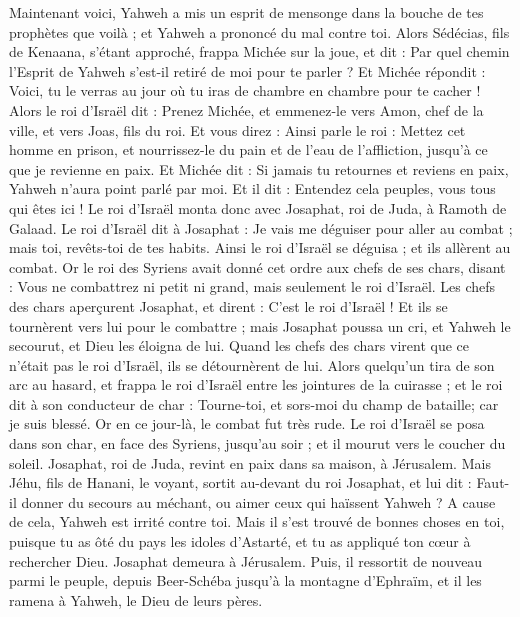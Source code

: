 \begin{multicols}{2}
Maintenant voici, Yahweh a mis un esprit de mensonge dans la bouche de tes prophètes que voilà ; et Yahweh a prononcé du mal contre toi.
Alors Sédécias, fils de Kenaana, s'étant approché, frappa Michée sur la joue, et dit : Par quel chemin l'Esprit de Yahweh s'est-il retiré de moi pour te parler ?
Et Michée répondit : Voici, tu le verras au jour où tu iras de chambre en chambre pour te cacher !
Alors le roi d'Israël dit : Prenez Michée, et emmenez-le vers Amon, chef de la ville, et vers Joas, fils du roi.
Et vous direz : Ainsi parle le roi : Mettez cet homme en prison, et nourrissez-le du pain et de l'eau de l'affliction, jusqu'à ce que je revienne en paix.
Et Michée dit : Si jamais tu retournes et reviens en paix, Yahweh n'aura point parlé par moi. Et il dit : Entendez cela peuples, vous tous qui êtes ici !
Le roi d'Israël monta donc avec Josaphat, roi de Juda, à Ramoth de Galaad.
Le roi d'Israël dit à Josaphat : Je vais me déguiser pour aller au combat ; mais toi, revêts-toi de tes habits. Ainsi le roi d'Israël se déguisa ; et ils allèrent au combat.
Or le roi des Syriens avait donné cet ordre aux chefs de ses chars, disant : Vous ne combattrez ni petit ni grand, mais seulement le roi d'Israël.
Les chefs des chars aperçurent Josaphat, et dirent : C'est le roi d'Israël ! Et ils se tournèrent vers lui pour le combattre ; mais Josaphat poussa un cri, et Yahweh le secourut, et Dieu les éloigna de lui.
Quand les chefs des chars virent que ce n'était pas le roi d'Israël, ils se détournèrent de lui.
Alors quelqu'un tira de son arc au hasard, et frappa le roi d'Israël entre les jointures de la cuirasse ; et le roi dit à son conducteur de char : Tourne-toi, et sors-moi du champ de bataille; car je suis blessé.
Or en ce jour-là, le combat fut très rude. Le roi d'Israël se posa dans son char, en face des Syriens, jusqu'au soir ; et il mourut vers le coucher du soleil.
\VerseOne{}Josaphat, roi de Juda, revint en paix dans sa maison, à Jérusalem.
Mais Jéhu, fils de Hanani, le voyant, sortit au-devant du roi Josaphat, et lui dit : Faut-il donner du secours au méchant, ou aimer ceux qui haïssent Yahweh ? A cause de cela, Yahweh est irrité contre toi.
Mais il s'est trouvé de bonnes choses en toi, puisque tu as ôté du pays les idoles d'Astarté, et tu as appliqué ton cœur à rechercher Dieu.
Josaphat demeura à Jérusalem. Puis, il ressortit de nouveau parmi le peuple, depuis Beer-Schéba jusqu'à la montagne d'Ephraïm, et il les ramena à Yahweh, le Dieu de leurs pères.

\end{multicols}
